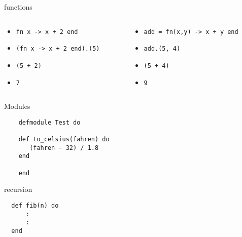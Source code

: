 \begin{frame}{functions}

  \begin{columns}[t]
    \begin{column}{0.5\textwidth}
  \begin{itemize}
   \pause \item {\tt fn x -> x + 2 end}
   \pause \item {\tt (fn x -> x + 2 end).(5)}
   \pause \item {\tt (5 + 2)}
   \pause \item {\tt 7}
  \end{itemize}
\end{column} \pause
\begin{column}{0.5\textwidth}
  \begin{itemize}
   \pause \item {\tt add = fn(x,y) -> x + y end}
   \pause \item {\tt add.(5, 4)}
   \pause \item {\tt (5 + 4)}
   \pause \item {\tt 9}
 \end{itemize}
\end{column}
\end{columns}\pause

\vspace{20pt}{\em Parenthesis are optional ... but quite nice to have.}

\vspace{20pt}{\em Can we give names to functions?}  
\end{frame}

\begin{frame}[fragile]{Modules}

  \begin{verbatim}
    defmodule Test do

    def to_celsius(fahren) do
       (fahren - 32) / 1.8
    end

    end
  \end{verbatim}

\end{frame}

\begin{frame}[fragile]{recursion}

\begin{verbatim}
  def fib(n) do 
      :
      :
  end
\end{verbatim}

\end{frame}

